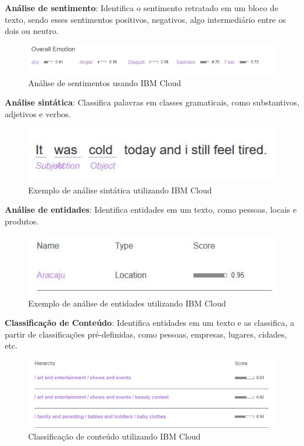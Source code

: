 \documentclass{article}
\begin{document}
\textbf{Análise de sentimento}: Identifica o sentimento retratado em um bloco de texto, sendo esses sentimentos positivos, negativos, algo intermediário entre os dois ou neutro. \\
\begin{figure}[H]
    \centering
    \includegraphics[scale=0.5]{imagens/nlp_sentimentos.jpg}
    \caption{Análise de sentimentos usando IBM Cloud}
    \label{fig:my_label}
\end{figure}{}
\textbf{Análise sintática}: Classifica palavras em classes gramaticais, como substantivos, adjetivos e verbos. \\
\begin{figure}[H]
    \centering
    \includegraphics[scale=0.5]{imagens/nlp_analise_sintatica.jpg}
    \caption{Exemplo de análise sintática utilizando IBM Cloud}
    \label{fig:sintatica}
\end{figure}{}
\textbf{Análise de entidades}: Identifica entidades em um texto, como pessoas, locais e produtos. \\
\begin{figure}[H]
    \centering
    \includegraphics[scale=0.5]{imagens/nlp_entidade.jpg}
    \caption{Exemplo de análise de entidades utilizando IBM Cloud}
    \label{fig:nlp_entidades}
\end{figure}{}
\textbf{Classificação de Conteúdo}: Identifica entidades em um texto e as classifica, a partir de classificações pré-definidas, como pessoas, empresas, lugares, cidades, etc.\\
\begin{figure}[H]
    \centering
    \includegraphics[scale=0.5]{imagens/nlp_classificacao.jpg}
    \caption{Classificação de conteúdo utilizando IBM Cloud}
    \label{fig:nlp_classificacao}
\end{figure}{}
\end{document}
